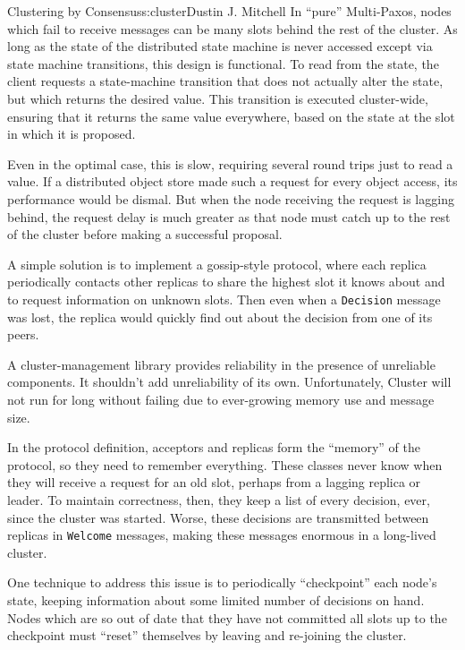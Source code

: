 \begin{aosachapter}{Clustering by Consensus}{s:cluster}{Dustin J. Mitchell}
In ``pure'' Multi-Paxos, nodes which fail to receive messages can be
many slots behind the rest of the cluster. As long as the state of the
distributed state machine is never accessed except via state machine
transitions, this design is functional. To read from the state, the
client requests a state-machine transition that does not actually alter
the state, but which returns the desired value. This transition is
executed cluster-wide, ensuring that it returns the same value
everywhere, based on the state at the slot in which it is proposed.

Even in the optimal case, this is slow, requiring several round trips
just to read a value. If a distributed object store made such a request
for every object access, its performance would be dismal. But when the
node receiving the request is lagging behind, the request delay is much
greater as that node must catch up to the rest of the cluster before
making a successful proposal.

A simple solution is to implement a gossip-style protocol, where each
replica periodically contacts other replicas to share the highest slot
it knows about and to request information on unknown slots. Then even
when a \texttt{Decision} message was lost, the replica would quickly
find out about the decision from one of its peers.

\label{consistent-memory-usage}

A cluster-management library provides reliability in the presence of
unreliable components. It shouldn't add unreliability of its own.
Unfortunately, Cluster will not run for long without failing due to
ever-growing memory use and message size.

In the protocol definition, acceptors and replicas form the ``memory''
of the protocol, so they need to remember everything. These classes
never know when they will receive a request for an old slot, perhaps
from a lagging replica or leader. To maintain correctness, then, they
keep a list of every decision, ever, since the cluster was started.
Worse, these decisions are transmitted between replicas in
\texttt{Welcome} messages, making these messages enormous in a
long-lived cluster.

One technique to address this issue is to periodically ``checkpoint''
each node's state, keeping information about some limited number of
decisions on hand. Nodes which are so out of date that they have not
committed all slots up to the checkpoint must ``reset'' themselves by
leaving and re-joining the cluster.


\end{aosachapter}
